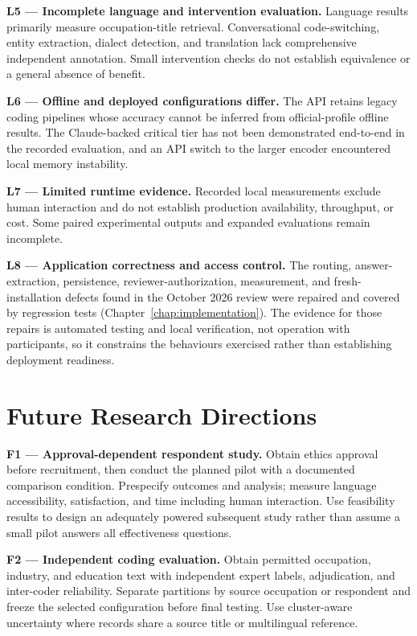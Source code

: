 \noindent\textbf{L5 --- Incomplete language and intervention evaluation.}
Language results primarily measure occupation-title retrieval. Conversational
code-switching, entity extraction, dialect detection, and translation lack
comprehensive independent annotation. Small intervention checks do not
establish equivalence or a general absence of benefit.

\noindent\textbf{L6 --- Offline and deployed configurations differ.}
The API retains legacy coding pipelines whose accuracy cannot be inferred
from official-profile offline results. The Claude-backed critical tier
has not been demonstrated end-to-end in the recorded evaluation, and
an API switch to the larger encoder encountered local memory instability.

\noindent\textbf{L7 --- Limited runtime evidence.}
Recorded local measurements exclude human interaction and do not
establish production availability, throughput, or cost. Some paired
experimental outputs and expanded evaluations remain incomplete.

\noindent\textbf{L8 --- Application correctness and access control.}
The routing, answer-extraction, persistence, reviewer-authorization,
measurement, and fresh-installation defects found in the October 2026
review were repaired and covered by regression tests
(Chapter~\ref{chap:implementation}). The evidence for those repairs is
automated testing and local verification, not operation with participants,
so it constrains the behaviours exercised rather than establishing
deployment readiness.

\section{Future Research Directions}
\label{sec:conc-future}

\noindent\textbf{F1 --- Approval-dependent respondent study.}
Obtain ethics approval before recruitment, then conduct the planned pilot
with a documented comparison condition. Prespecify outcomes and analysis;
measure language accessibility, satisfaction, and time including human
interaction. Use feasibility results to design an adequately powered
subsequent study rather than assume a small pilot answers all effectiveness
questions.

\noindent\textbf{F2 --- Independent coding evaluation.}
Obtain permitted occupation, industry, and education text with independent
expert labels, adjudication, and inter-coder reliability. Separate
partitions by source occupation or respondent and freeze the selected
configuration before final testing. Use cluster-aware uncertainty where
records share a source title or multilingual reference.

